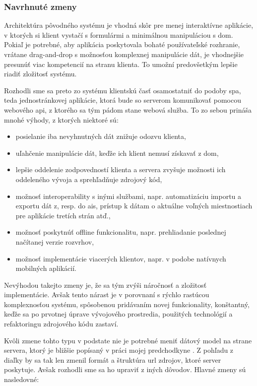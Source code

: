 \subsubsection{Navrhnuté zmeny}

Architektúra pôvodného systému je vhodná skôr pre menej interaktívne aplikácie,
v ktorých si klient vystačí s formulármi a minimálnou manipuláciou s
\acrfull{dom}. Pokiaľ je potrebné, aby aplikácia poskytovala bohaté
používateľské rozhranie, vrátane drag-and-drop s možnosťou komplexnej
manipulácie dát, je vhodnejšie presunúť viac kompetencií na stranu klienta. To
umožní predovšetkým lepšie riadiť zložitosť systému.

Rozhodli sme sa preto zo systému klientskú časť osamostatniť do podoby
\acrfull{spa}, teda jednostránkovej aplikácie, ktorá bude so serverom
komunikovať pomocou webového \acrshort{api}, z ktorého sa tým pádom stane webová
služba. To zo sebou prináša mnohé výhody, z ktorých niektoré sú:

\begin{itemize}
\item posielanie iba nevyhnutných dát znižuje odozvu klienta,
\item uľahčenie manipulácie dát, keďže ich klient nemusí získavať z
  \acrshort{dom},
\item lepšie oddelenie zodpovedností klienta a servera zvyšuje možnosti ich
  oddeleného vývoja a sprehľadňuje zdrojový kód,
\item možnosť interoperability s inými službami, napr. automatizáciu importu a
  exportu dát z, resp. do \acrshort{ais}, prístup k dátam o aktuálne
  voľných miestnostiach pre aplikácie tretích strán atď.,
\item možnosť poskytnúť offline funkcionalitu, napr. prehliadanie poslednej
  načítanej verzie rozvrhov,
\item možnosť implementácie viacerých klientov, napr. v podobe natívnych
  mobilných aplikácií.
\end{itemize}

Nevýhodou takejto zmeny je, že sa tým zvýši náročnosť a zložitosť implementácie.
Avšak tento nárast je v porovnaní s rýchlo rastúcou komplexnosťou systému,
spôsobenou pridávaním novej funkcionality, konštantný, keďže sa po prvotnej
úprave vývojového prostredia, použitých technológií a refaktoringu zdrojového
kódu zastaví.

Kvôli zmene tohto typu v podstate nie je potrebné meniť dátový model na strane
servera, ktorý je bližšie popísaný v práci mojej predchodkyne \cite{knap}. Z
pohľadu z diaľky by sa tak len zmenil formát a štruktúra \acrshort{url} zdrojov,
ktoré server poskytuje. Avšak rozhodli sme sa ho upraviť z iných dôvodov. Hlavné
zmeny sú nasledovné:

